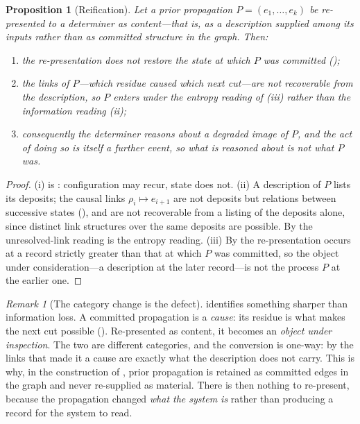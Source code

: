 \documentclass[11pt,twocolumn,a4paper]{article}
\theoremstyle{dirthm}
\newtheorem{proposition}[theorem]{Proposition}
\theoremstyle{definition}
\theoremstyle{remark}
\newtheorem{remark}[theorem]{Remark}
\newcommand{\res}{\rho}
\begin{document}
\begin{proposition}[Reification]
\label{prop:reification}
Let a prior propagation $P=(e_1,\dots,e_k)$ be re-presented to a determiner
as content---that is, as a description supplied among its inputs rather than
as committed structure in the graph. Then:
\begin{enumerate}[label=\textup{(\roman*)},leftmargin=2.0em,itemsep=1pt]
\item the re-presentation does not restore the state at which $P$ was
committed ();
\item the links of $P$---which residue caused which next cut---are not
recoverable from the description, so $P$ enters under the entropy reading of
(iii) rather than the information reading
(ii);
\item consequently the determiner reasons about a degraded image of $P$, and
the act of doing so is itself a further event, so what is reasoned about is
not what $P$ was.
\end{enumerate}
\end{proposition}

\begin{proof}
(i) is : configuration may recur, state does not. (ii) A
description of $P$ lists its deposits; the causal links $\res_i\mapsto
e_{i+1}$ are not deposits but relations between successive states
(), and are not recoverable from a listing of the
deposits alone, since distinct link structures over the same deposits are
possible. By  the unresolved-link reading is the entropy
reading. (iii) By  the re-presentation occurs at a record
strictly greater than that at which $P$ was committed, so the object under
consideration---a description at the later record---is not the process $P$ at
the earlier one.
\end{proof}

\begin{remark}[The category change is the defect]
\label{rem:category-change}
 identifies something sharper than information loss.
A committed propagation is a \emph{cause}: its residue is what makes the next
cut possible (). Re-presented as content, it becomes an
\emph{object under inspection}. The two are different categories, and the
conversion is one-way: by  the links that made it a cause are
exactly what the description does not carry. This is why, in the construction
of , prior propagation is retained as committed edges in the
graph and never re-supplied as material. There is then nothing to re-present,
because the propagation changed \emph{what the system is} rather than
producing a record for the system to read.
\end{remark}
\end{document}
